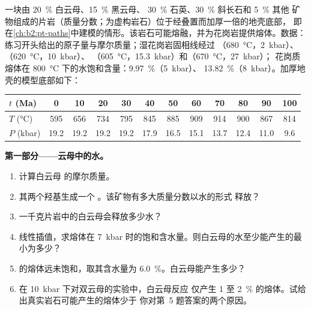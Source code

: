 \begin{problem}\label{pb:b2:crustal-melting:1}
一块由 \qty{20}{\percent} 白云母、\qty{15}{\percent} 黑云母、
\qty{30}{\percent} 石英、\qty{30}{\percent} 斜长石和 \qty{5}{\percent} 其他
矿物组成的片岩（质量分数；为虚构岩石）位于经叠置而加厚一倍的地壳底部，
即在\cref{ch:b2:pt-paths}中建模的情形。该岩石可能熔融，并为花岗岩提供熔体。数据：
练习开头给出的原子量与摩尔质量；湿花岗岩固相线经过
（\qty{680}{\celsius}，\qty{2}{kbar}）、（\qty{620}{\celsius}，\qty{10}{kbar}）、
（\qty{605}{\celsius}，\qty{15.3}{kbar}）和（\qty{670}{\celsius}，\qty{27}{kbar}）；
花岗质熔体在 \qty{800}{\celsius} 下的水饱和含量：\qty{9.97}{\percent}（\qty{5}{kbar}）、
\qty{13.82}{\percent}（\qty{8}{kbar}）。加厚地壳的模型底部如下：

\smallskip
\begin{center}\small
\begin{tabular}{l|ccccccccccc}
$t$ (\unit{Ma}) & 0 & 10 & 20 & 30 & 40 & 50 & 60 & 70 & 80 & 90 & 100\\ \hline
$T$ (\unit{\celsius}) & 595 & 656 & 734 & 795 & 845 & 885 & 909 & 914 & 900 & 867 & 814\\
$P$ (\unit{kbar}) & 19.2 & 19.2 & 19.2 & 19.2 & 17.9 & 16.5 & 15.1 & 13.7 & 12.4 & 11.0 & 9.6
\end{tabular}
\end{center}
\smallskip

\noindent\textbf{第一部分——云母中的水。}
\begin{enumerate}
\item 计算白云母  的摩尔质量。
\item 其两个羟基生成一个 。该矿物有多大质量分数以水的形式
释放？
\item 一千克片岩中的白云母会释放多少水？
\item 线性插值，求熔体在
\qty{7}{kbar} 时的饱和含水量。则白云母的水至少能产生的最小为多少？
\item {}的熔体远未饱和，取其含水量为
\qty{6.0}{\percent}。白云母能产生多少？
\item 在 \qty{10}{kbar} 下对双云母的实验中，白云母反应
仅产生 1 至 \qty{2}{\percent} 的熔体。试给出真实岩石可能产生的熔体少于
你对第~5 题答案的两个原因。
\end{enumerate}


\end{problem}
